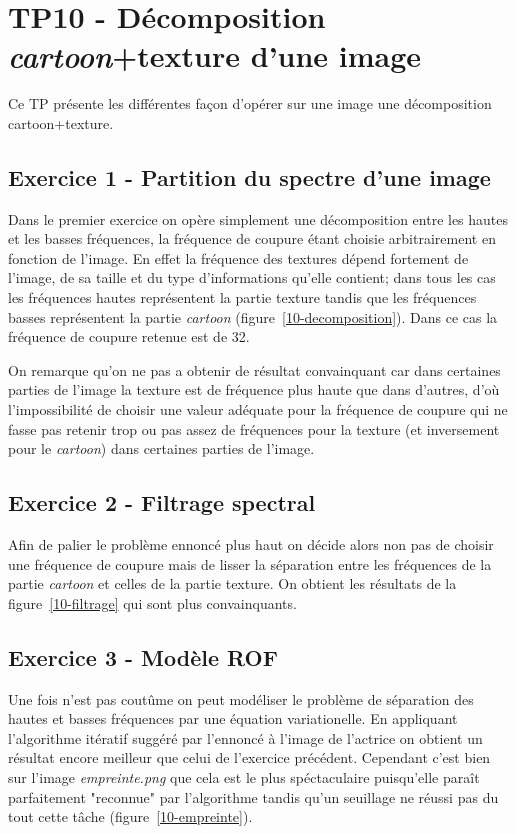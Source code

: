 \section{TP10 - Décomposition \emph{cartoon}+texture d'une image}
Ce TP présente les différentes façon d'opérer sur une image une décomposition cartoon+texture.

\subsection{Exercice 1 - Partition du spectre d'une image}
Dans le premier exercice on opère simplement une décomposition entre les hautes et les basses fréquences, la fréquence de coupure étant choisie arbitrairement en fonction de l'image. En effet la fréquence des textures dépend fortement de l'image, de sa taille et du type d'informations qu'elle contient; dans tous les cas les fréquences hautes représentent la partie texture tandis que les fréquences basses représentent la partie \emph{cartoon} (figure~\ref{10-decomposition}). Dans ce cas la fréquence de coupure retenue est de 32.

\begin{figure}
\end{figure}

On remarque qu'on ne pas a obtenir de résultat convainquant car dans certaines parties de l'image la texture est de fréquence plus haute que dans d'autres, d'où l'impossibilité de choisir une valeur adéquate pour la fréquence de coupure qui ne fasse pas retenir trop ou pas assez de fréquences pour la texture (et inversement pour le \emph{cartoon}) dans certaines parties de l'image.

\subsection{Exercice 2 - Filtrage spectral}
Afin de palier le problème ennoncé plus haut on décide alors non pas de choisir une fréquence de coupure mais de lisser la séparation entre les fréquences de la partie \emph{cartoon} et celles de la partie texture. On obtient les résultats de la figure~\ref{10-filtrage} qui sont plus convainquants.

\begin{figure}
\end{figure}

\subsection{Exercice 3 - Modèle ROF}
Une fois n'est pas coutûme on peut modéliser le problème de séparation des hautes et basses fréquences par une équation variationelle. En appliquant l'algorithme itératif suggéré par l'ennoncé à l'image de l'actrice on obtient un résultat encore meilleur que celui de l'exercice précédent. Cependant c'est bien sur l'image \emph{empreinte.png} que cela est le plus spéctaculaire puisqu'elle paraît parfaitement "reconnue" par l'algorithme tandis qu'un seuillage ne réussi pas du tout cette tâche (figure~\ref{10-empreinte}).

